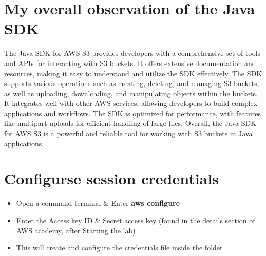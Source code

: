 \section{My overall observation of the Java SDK}
The Java SDK for AWS S3 provides developers with a comprehensive set of tools and APIs for interacting with S3 buckets. It offers extensive documentation and resources, making it easy to understand and utilize the SDK effectively. The SDK supports various operations such as creating, deleting, and managing S3 buckets, as well as uploading, downloading, and manipulating objects within the buckets. It integrates well with other AWS services, allowing developers to build complex applications and workflows. The SDK is optimized for performance, with features like multipart uploads for efficient handling of large files. Overall, the Java SDK for AWS S3 is a powerful and reliable tool for working with S3 buckets in Java applications.

\section{Configurse session credentials}
\begin{itemize}
    \item Open a command terminal \& Enter \textbf{aws configure}
    \item Enter the Access key ID \& Secret access  key (found in the details section of AWS academy, after Starting the lab)
    \item This will create and configure the credentials file inside  
 the folder \newline \textbf{}
\end{itemize}
